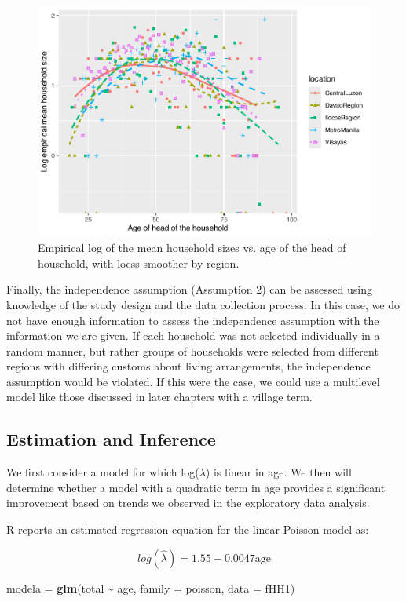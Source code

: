 \documentclass[
]{krantz}
\newenvironment{Shaded}{\begin{snugshade}}{\end{snugshade}}
\newcommand{\AttributeTok}[1]{\textcolor[rgb]{0.27,0.27,0.27}{#1}}
\newcommand{\FunctionTok}[1]{\textcolor[rgb]{0.27,0.27,0.27}{\textbf{#1}}}
\newcommand{\NormalTok}[1]{#1}
\newcommand{\OtherTok}[1]{\textcolor[rgb]{0.37,0.37,0.37}{#1}}
\newcommand{\SpecialCharTok}[1]{\textcolor[rgb]{0.43,0.43,0.43}{\textbf{#1}}}
\begin{document}
\begin{figure}

{\centering \includegraphics[width=0.6\linewidth]{bookdown-BeyondMLR_files/figure-latex/byregion-1} 

}

\caption{Empirical log of the mean household sizes vs. age of the head of household, with loess smoother by region.}\label{fig:byregion}
\end{figure}

Finally, the independence assumption (Assumption 2) can be assessed using knowledge of the study design and the data collection process. In this case, we do not have enough information to assess the independence assumption with the information we are given. If each household was not selected individually in a random manner, but rather groups of households were selected from different regions with differing customs about living arrangements, the independence assumption would be violated. If this were the case, we could use a multilevel model like those discussed in later chapters with a village term.

\subsection{Estimation and Inference}\label{sec-PoisInference}

We first consider a model for which log(\(\lambda\)) is linear in age. We then will determine whether a model with a quadratic term in age provides a significant improvement based on trends we observed in the exploratory data analysis.

R reports an estimated regression equation for the linear Poisson model as:

\begin{equation*}
log(\hat{\lambda}) = 1.55 - 0.0047 \textrm{age}
\end{equation*}

\begin{Shaded}
\begin{Highlighting}[]
\NormalTok{modela }\OtherTok{=} \FunctionTok{glm}\NormalTok{(total }\SpecialCharTok{\textasciitilde{}}\NormalTok{ age, }\AttributeTok{family =}\NormalTok{ poisson, }\AttributeTok{data =}\NormalTok{ fHH1)}
\end{Highlighting}
\end{Shaded}
\end{document}

